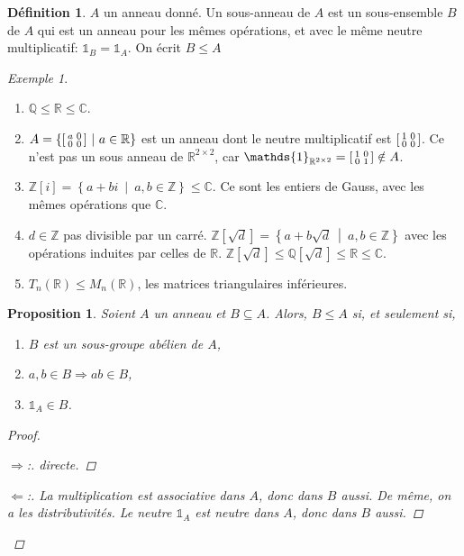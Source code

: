 \documentclass{report}
\newtheorem*{prop}{Proposition}
\theoremstyle{definition}
\newtheorem*{dfn}{D\'efinition}
\theoremstyle{remark}
\newtheorem*{exem}{Exemple}
\newenvironment*{subproof}[1][D\'emonstration]
{
\begin{proof}[#1]

}
{
\renewcommand{\qedsymbol}{$\blacksquare$}
\end{proof}
\renewcommand{\qedsymbol}{$\square$}
}
\def\lte{\leqslant}
\def\ZZ{\mathbb{Z}}
\def\QQ{\mathbb{Q}}
\def\RR{\mathbb{R}}
\def\CC{\mathbb{C}}
\def\id{\mathds{1}}
\begin{document}
	\begin{dfn}
		$A$ un anneau donn\'e. Un sous-anneau de $A$ est un sous-ensemble $B$ de $A$ qui est un anneau pour les m\^emes op\'erations, et avec le m\^eme neutre multiplicatif: $\id_B=\id_A$. On \'ecrit $B \lte A$
	\end{dfn}

	\begin{exem}
		\begin{enumerate}
			\item $\QQ \lte \RR \lte \CC$.
			\item $A=\left\{ \begin{bsmallmatrix}
				a&0\\0&0
			\end{bsmallmatrix} ~\middle|~ a \in \RR \right\}$ est un anneau dont le neutre multiplicatif est $\begin{bsmallmatrix}
				1&0\\0&0
			\end{bsmallmatrix}$. Ce n'est pas un sous anneau de $\RR^{2 \times 2}$, car $\id_{\RR^{2\times2}} = \begin{bsmallmatrix}
				1&0\\0&1
			\end{bsmallmatrix} \notin A$.
			\item $\ZZ[i] = \left\{ a+bi ~\middle|~ a,b \in \ZZ \right\} \lte \CC$. Ce sont les entiers de Gauss, avec les m\^emes op\'erations que $\CC$.
			\item $d \in \ZZ$ pas divisible par un carr\'e. $\ZZ[\sqrt{d}] = \left\{ a+b\sqrt{d} ~\middle|~ a,b \in \ZZ \right\}$ avec les op\'erations induites par celles de $\RR$. $\ZZ[\sqrt{d}] \lte \QQ[\sqrt{d}] \lte \RR \lte \CC$.
			\item $T_n(\RR) \lte M_n(\RR)$, les matrices triangulaires inf\'erieures.
		\end{enumerate}
	\end{exem}

	\begin{prop}
		Soient $A$ un anneau et $B \subseteq A$. Alors, $B \lte A$ si, et seulement si,
		\begin{enumerate}
			\item $B$ est un sous-groupe ab\'elien de $A$,
			\item $a,b \in B \Rightarrow ab \in B$,
			\item $\id_A \in B$.
		\end{enumerate}
		\begin{proof}
			\begin{subproof}[$\Rightarrow$:]
				directe.
			\end{subproof}
			\begin{subproof}[$\Leftarrow$:]
				La multiplication est associative dans $A$, donc dans $B$ aussi. De m\^eme, on a les distributivit\'es. Le neutre $\id_A$ est neutre dans $A$, donc dans $B$ aussi.
			\end{subproof}
		\end{proof}
	\end{prop}
\end{document}
